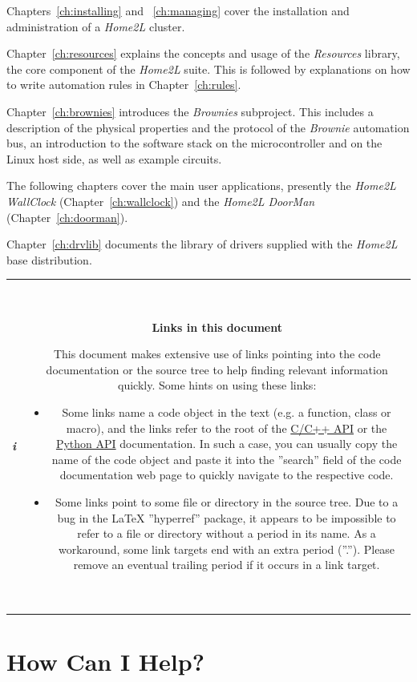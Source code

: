 \documentclass[12pt,english,parskip=half,headheight=19pt]{scrreprt}
\newcommand{\infobox}[1]{
  \par
  \medskip
  \hfill
  \setlength\arrayrulewidth{1pt}
  \begin{tabular}[t]{c|c|}
    \parbox{1.8em}{\hfill\textit{\Huge\textbf{i}\,}}
    &
    \,\parbox{0.89\linewidth}{\setlength{\parskip}{0.5em} \small #1}\,
  \end{tabular}
  \medskip
  \par
}
\newcommand{\refdoc}[2]{\href{#1}{#2}}              %
\newcommand{\theapic}{\refdoc{home2l-api_c/index.html}{C/C++ API}}
\newcommand{\theapipython}{\refdoc{home2l-api_python/index.html}{Python API}}
\begin{document}
Chapters~\ref{ch:installing} and ~\ref{ch:managing} cover the installation and administration of a \textit{Home2L} cluster.

Chapter~\ref{ch:resources} explains the concepts and usage of the \textit{Resources} library, the core component of the \textit{Home2L} suite. This is followed by explanations on how to write automation rules in Chapter~\ref{ch:rules}.

Chapter~\ref{ch:brownies} introduces the \textit{Brownies} subproject. This includes a description of the physical properties and the protocol of the \textit{Brownie} automation bus, an introduction to the software stack on the microcontroller and on the Linux host side, as well as example circuits.

The following chapters cover the main user applications, presently the \textit{Home2L WallClock} (Chapter~\ref{ch:wallclock}) and the \textit{Home2L DoorMan} (Chapter~\ref{ch:doorman}).

Chapter~\ref{ch:drvlib} documents the library of drivers supplied with the \textit{Home2L} base distribution.


\infobox{
  \textbf{Links in this document}

  This document makes extensive use of links pointing into the code documentation or the source tree to help finding
  relevant information quickly. Some hints on using these links:
  \begin{itemize}
    \item
      Some links name a code object in the text (e.g. a function, class or macro), and the links refer to the root
      of the \theapic{} or the \theapipython{} documentation. In such a case, you can usually copy the name of the code object
      and paste it into the ''search'' field of the code documentation web page to quickly navigate to the respective code.
    \item
      Some links point to some file or directory in the source tree. Due to a bug in the LaTeX ''hyperref'' package,
      it appears to be impossible to refer to a file or directory without a period in its name.
      As a workaround, some link targets end with an extra period (''.'').
      Please remove an eventual trailing period if it occurs in a link target.
  \end{itemize}
}





\clearpage
\section{How Can I Help?}
\label{sec:helping}
\end{document}
